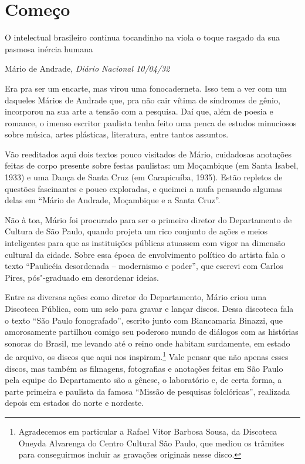 \chapter*{Começo}

\epigraph{O intelectual brasileiro continua tocandinho na viola
o toque rasgado da sua pasmosa inércia humana}{Mário de Andrade, \emph{Diário Nacional 10/04/32}}

Era pra ser um encarte, mas virou uma fonocaderneta. Isso tem a ver com
um daqueles Mários de Andrade que, pra não cair vítima de síndromes de
gênio, incorporou na sua arte a tensão com a pesquisa. Daí que, além de
poesia e romance, o imenso escritor paulista tenha feito uma penca de
estudos minuciosos sobre música, artes plásticas, literatura, entre
tantos assuntos.

Vão reeditados aqui dois textos pouco visitados de Mário, cuidadosas
anotações feitas de corpo presente sobre festas paulistas: um Moçambique
(em Santa Isabel, 1933) e uma Dança de Santa Cruz (em Carapicuíba,
1935). Estão repletos de questões fascinantes e pouco exploradas, e
queimei a mufa pensando algumas delas em ``Mário de Andrade, Moçambique
e a Santa Cruz''.

Não à toa, Mário foi procurado para ser o primeiro diretor do
Departamento de Cultura de São Paulo, quando projeta um rico conjunto de
ações e meios inteligentes para que as instituições públicas atuassem
com vigor na dimensão cultural da cidade. Sobre essa época de
envolvimento político do artista fala o texto ``Paulicéia desordenada --
modernismo e poder'', que escrevi com Carlos Pires, pós"-graduado em
desordenar ideias.

Entre as diversas ações como diretor do Departamento, Mário criou uma
Discoteca Pública, com um selo para gravar e lançar discos. Dessa
discoteca fala o texto ``São Paulo fonografado'', escrito junto com
Biancamaria Binazzi, que amorosamente partilhou comigo seu poderoso
mundo de diálogos com as histórias sonoras do Brasil, me levando até o
reino onde habitam surdamente, em estado de arquivo, os discos que aqui
nos inspiram.\footnote{Agradecemos em particular a Rafael Vitor Barbosa
  Sousa, da Discoteca Oneyda Alvarenga do Centro Cultural São Paulo, que
  mediou os trâmites para conseguirmos incluir as gravações originais
  nesse disco.} Vale pensar que não apenas esses discos, mas também as
filmagens, fotografias e anotações feitas em São Paulo pela equipe do
Departamento são a gênese, o laboratório e, de certa forma, a parte
primeira e paulista da famosa ``Missão de pesquisas folclóricas'',
realizada depois em estados do norte e nordeste.

